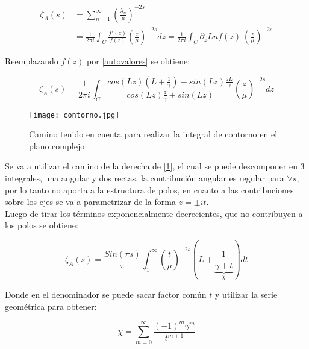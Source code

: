 \begin{equation}
\begin{aligned}
   \zeta _A (s) &=  \sum _{n=1} ^{\infty} \left( \frac{\lambda _n}{\mu} \right) ^{-2s} \\[5pt] &=  
   \frac{1}{2 \pi i} \int _{C} \frac{f'(z)}{f(z)} \left( \frac{z}{\mu} \right) ^{-2s} dz 
   =  \frac{1}{2 \pi i} \int _{C} \partial _z Ln f(z) \ 
	   \left( \frac{z}{\mu} \right) ^{-2s}
\end{aligned}
\label{asd}
\end{equation}

Reemplazando $f(z)$ por  \ref{autovalores} se obtiene:

\begin{equation}
	\zeta _A (s) = 
    \frac{1}{2 \pi i} \int _{C}
    \frac{ cos(L z) \left(L + \frac{1}{\gamma} \right) - sin(L z) \frac{z L}{\gamma}
    }
    {cos(L z) \frac{z}{\gamma} + sin(L z)
    }
    \left( \frac{z}{\mu} \right) ^{-2 s} dz
\end{equation}


\begin{figure}
\centering
\texttt{[image: contorno.jpg]}
\caption{Camino tenido en cuenta para realizar la integral de contorno en el plano complejo}
\label{fig:contorno}
\end{figure}




Se va a utilizar el camino de la derecha de [\ref{fig:contorno}], el cual se puede descomponer en 3 integrales, una angular y dos rectas, la contribución angular es regular para $ \forall s$, por lo tanto no aporta a la estructura de polos, en cuanto a las contribuciones sobre los ejes se va a parametrizar de la forma $z = \pm i  t$. \\ 


	Luego de tirar los términos exponencialmente decrecientes, que no contribuyen a los polos se obtiene:

\begin{equation}
	\zeta _A (s) = 
    \frac{Sin(\pi s)}{ \pi } 
    \int _1 ^{\infty} 
    \left( \frac{t}{\mu}  \right)^{-2s}
    \left(
    	L + 
	    \underbrace
    	{
		\frac{1}{\gamma + t}   
		} _{\chi} 
	\right)
    dt 
\label{contorno}
\end{equation}

Donde en el denominador se puede sacar factor común $t$ y utilizar la serie geométrica para obtener:

\begin{equation}
    \chi =   \sum _{m=0} ^{\infty} \frac{(-1) ^{m} \gamma ^{m} }{t ^{m+1}}
\label{eq:chi}
\end{equation}

